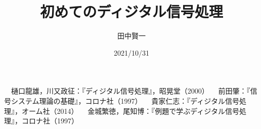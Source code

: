 \documentclass[dvipdfmx,%
  paper=b5,%
]{kddbook}
\title{初めてのディジタル信号処理}
\author{田中賢一}
\date{2021/10/31}
\begin{document}
\frontmatter

\setcounter{page}{3}
\pagestyle{footnombre}

\clearpage
\pagestyle{empty}

\cleardoublepage
\pagestyle{bothstyle}
\tableofcontents

\mainmatter










%





\clearpage
\pagestyle{footnombre}




\clearpage


\begin{thebibliography}{99}



	　樋口龍雄，川又政征：『ディジタル信号処理』，昭晃堂（2000）
	　前田肇：『信号システム理論の基礎』，コロナ社（1997）
	　貴家仁志：『ディジタル信号処理』，オーム社（2014）
	　金城繁徳，尾知博：『例題で学ぶディジタル信号処理』，コロナ社（1997）
\end{thebibliography}

\backmatter
%
\end{document}
